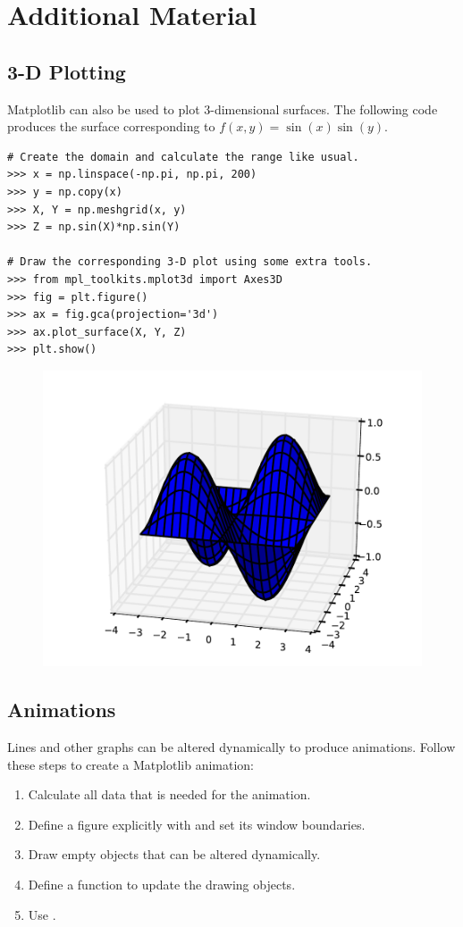 \newpage

\section*{Additional Material} %

\subsection*{3-D Plotting} %

Matplotlib can also be used to plot 3-dimensional surfaces.
The following code produces the surface corresponding to $f(x,y) = \sin(x)\sin(y)$.

\begin{lstlisting}
# Create the domain and calculate the range like usual.
>>> x = np.linspace(-np.pi, np.pi, 200)
>>> y = np.copy(x)
>>> X, Y = np.meshgrid(x, y)
>>> Z = np.sin(X)*np.sin(Y)

# Draw the corresponding 3-D plot using some extra tools.
>>> from mpl_toolkits.mplot3d import Axes3D
>>> fig = plt.figure()
>>> ax = fig.gca(projection='3d')
>>> ax.plot_surface(X, Y, Z)
>>> plt.show()
\end{lstlisting}

\begin{figure}[H]
    \includegraphics[width=.7\textwidth]{figures/surface_plot.pdf}
\end{figure}

\subsection*{Animations} %

Lines and other graphs can be altered dynamically to produce animations.
Follow these steps to create a Matplotlib animation:
%
\begin{enumerate}
    \item Calculate all data that is needed for the animation.
    \item Define a figure explicitly with  and set its window boundaries.
    \item Draw empty objects that can be altered dynamically.
    \item Define a function to update the drawing objects.
    \item Use .
\end{enumerate}

